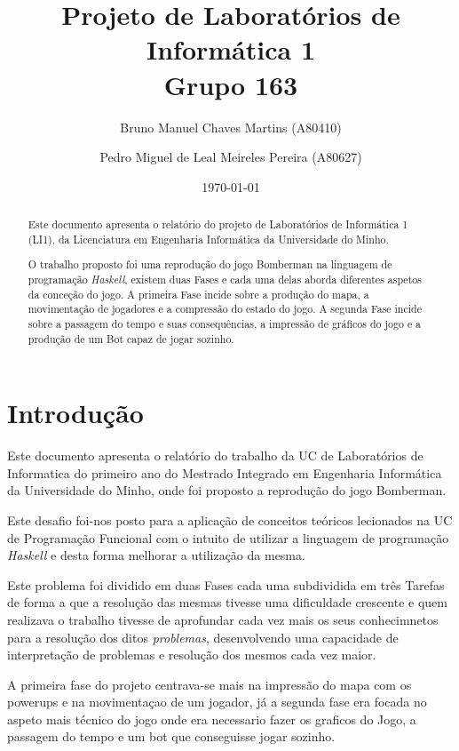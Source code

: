 \documentclass[a4paper]{article}
\title{Projeto de Laboratórios de Informática 1\\Grupo 163}
\author{Bruno Manuel Chaves Martins (A80410) \and Pedro Miguel de Leal Meireles Pereira (A80627)}
\date{\today}
\begin{document}
\maketitle

\begin{abstract}
  Este documento apresenta o relatório do projeto de Laboratórios de Informática
  1 (LI1), da Licenciatura em Engenharia Informática da Universidade
  do Minho.

  O trabalho proposto foi uma reprodução do jogo Bomberman na linguagem de 
  programação \emph{Haskell}, existem duas Fases e cada uma delas aborda 
  diferentes aspetos da conceção do jogo. A primeira Fase incide sobre 
  a produção do mapa, a movimentação de jogadores e a compressão do estado do jogo.
  A segunda Fase incide sobre a passagem do tempo e suas consequências, a impressão de
  gráficos do jogo e a produção de um Bot capaz de jogar sozinho.
\end{abstract}

\tableofcontents

\section{Introdução}
\label{sec:intro}

Este documento apresenta o relatório do trabalho da UC de 
Laboratórios de Informatica do primeiro ano do Mestrado Integrado 
em Engenharia Informática da Universidade do Minho, onde foi proposto 
a reprodução do jogo Bomberman.

Este desafio foi-nos posto para a aplicação de conceitos teóricos 
lecionados na UC de Programação Funcional com o intuito de utilizar a
linguagem de programação \emph{Haskell} e desta forma melhorar a utilização 
da mesma.

Este problema foi dividido em duas Fases cada uma subdividida em três Tarefas
de forma a que a resolução das mesmas tivesse uma dificuldade crescente e quem realizava 
o trabalho tivesse de aprofundar cada vez mais os seus conhecimnetos para a resolução dos 
ditos \emph{problemas}, desenvolvendo uma capacidade de interpretação de problemas e resolução dos mesmos 
cada vez maior. 

A primeira fase do projeto centrava-se mais na impressão do mapa com os powerups
e na movimentaçao de um jogador, já a segunda fase era focada no aspeto mais técnico
do jogo onde era necessario fazer os graficos do Jogo, a passagem do tempo e um
bot que conseguisse jogar sozinho.
\end{document}
